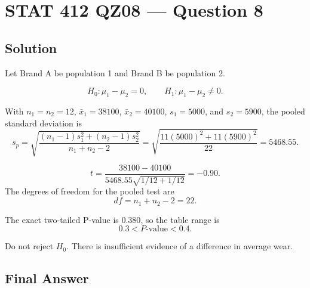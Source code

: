 \documentclass[11pt]{article}
\begin{document}
\section*{STAT 412 QZ08 --- Question 8}

\subsection*{Solution}

Let Brand A be population 1 and Brand B be population 2.

\[
H_0:\mu_1-\mu_2=0,\qquad H_1:\mu_1-\mu_2\ne0.
\]

With \(n_1=n_2=12\), \(\bar{x}_1=38100\), \(\bar{x}_2=40100\), \(s_1=5000\), and \(s_2=5900\), the pooled standard deviation is
\[
s_p=\sqrt{\frac{(n_1-1)s_1^2+(n_2-1)s_2^2}{n_1+n_2-2}}
=\sqrt{\frac{11(5000)^2+11(5900)^2}{22}}
=5468.55.
\]

\[
t=\frac{38100-40100}{5468.55\sqrt{1/12+1/12}}=-0.90.
\]
The degrees of freedom for the pooled test are
\[
df=n_1+n_2-2=22.
\]

The exact two-tailed P-value is \(0.380\), so the table range is
\[
0.3<P\text{-value}<0.4.
\]

Do not reject \(H_0\). There is insufficient evidence of a difference in average wear.

\subsection*{Final Answer}

\end{document}
